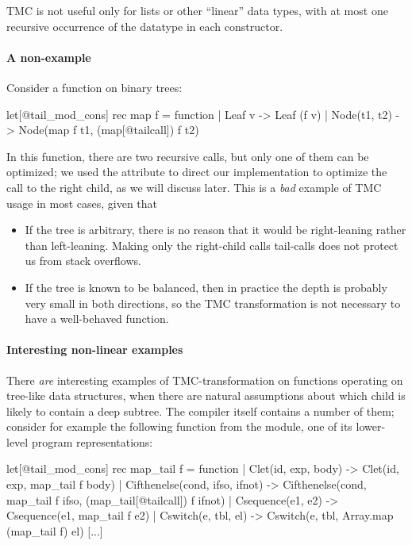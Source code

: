 TMC is not useful only for lists or other ``linear'' data types, with
at most one recursive occurrence of the datatype in each
constructor.

\paragraph{A non-example} Consider a  function on binary
trees:
\begin{Ocaml}
let[@tail_mod_cons] rec map f = function
| Leaf v -> Leaf (f v)
| Node(t1, t2) -> Node(map f t1, (map[@tailcall]) f t2)
\end{Ocaml}
In this function, there are two recursive calls, but only one of them
can be optimized; we used the \ocaml{[@tailcall]} attribute to direct
our implementation to optimize the call to the right child, as we will
discuss later. This is a \emph{bad} example of TMC usage in most
cases, given that
\begin{itemize}
\item If the tree is arbitrary, there is no reason that it would be
  right-leaning rather than left-leaning. Making only the right-child
  calls tail-calls does not protect us from stack overflows.
\item If the tree is known to be balanced, then in practice the depth
  is probably very small in both directions, so the TMC transformation
  is not necessary to have a well-behaved function.
\end{itemize}

\paragraph{Interesting non-linear examples} There \emph{are} interesting
examples of TMC-transformation on functions operating on tree-like
data structures, when there are natural assumptions about which child
is likely to contain a deep subtree. The \OCaml compiler itself
contains a number of them; consider for example the following function
from the  module, one of its lower-level program
representations:

\begin{Ocaml}
let[@tail_mod_cons] rec map_tail f = function
  | Clet(id, exp, body) ->
      Clet(id, exp, map_tail f body)
  | Cifthenelse(cond, ifso, ifnot) ->
      Cifthenelse(cond, map_tail f ifso, (map_tail[@tailcall]) f ifnot)
  | Csequence(e1, e2) ->
      Csequence(e1, map_tail f e2)
  | Cswitch(e, tbl, el) ->
      Cswitch(e, tbl, Array.map (map_tail f) el)
  [...]
\end{Ocaml}

